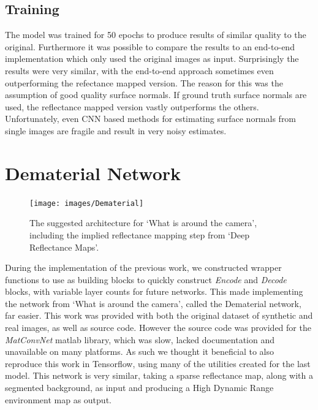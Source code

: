\documentclass[ %
                    author={Gavin Parker},
                supervisor={Dr. Neill Campbell},
                    degree={MEng},
                     title={Deep Learning for Illumination Estimation from Stereo Images},
                  subtitle={},
                      type={Research},
                      year={2018} ]{dissertation}
\begin{document}
\subsection{Training}
The model was trained for 50 epochs to produce results of similar quality to the original. Furthermore it was possible to compare the results to an end-to-end implementation which only used the original images as input. Surprisingly the results were very similar, with the end-to-end approach sometimes even outperforming the refectance mapped version. The reason for this was the assumption of good quality surface normals. If ground truth surface normals are used, the reflectance mapped version vastly outperforms the others. Unfortunately, even CNN based methods for estimating surface normals from single images are fragile and result in very noisy estimates.
\section{Dematerial Network}
\begin{figure}[H]
\texttt{[image: images/Dematerial]}
\caption 
\newline
The suggested architecture for `What is around the camera', including the implied reflectance mapping step from `Deep Reflectance Maps'.
\end{figure}
During the implementation of the previous work, we constructed wrapper functions to use as building blocks to quickly construct \textit{Encode} and \textit{Decode} blocks, with variable layer counts for future networks. This made implementing the network from `What is around the camera', called the Dematerial network, far easier. This work was provided with both the original dataset of synthetic and real images, as well as source code. However the source code was provided for the \textit{MatConvNet} matlab library, which was slow, lacked documentation and unavailable on many platforms. As such we thought it beneficial to also reproduce this work in Tensorflow, using many of the utilities created for the last model. This network is very similar, taking a sparse reflectance map, along with a segmented background, as input and producing a High Dynamic Range environment map as output.
\end{document}

